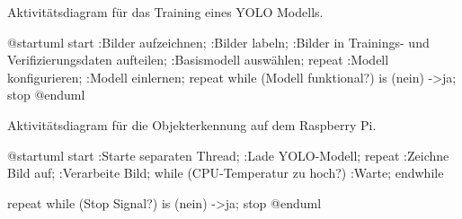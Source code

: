 
Aktivitätsdiagram für das Training eines YOLO Modells.

\begin{plantuml}    
@startuml
start
:Bilder aufzeichnen;
:Bilder labeln;
:Bilder in Trainings- und Verifizierungsdaten aufteilen;
:Basismodell auswählen;
repeat
    :Modell konfigurieren;
    :Modell einlernen;
repeat while (Modell funktional?) is (nein)
->ja;
stop
@enduml
\end{plantuml}


Aktivitätsdiagram für die Objekterkennung auf dem Raspberry Pi.

\begin{plantuml}
@startuml
start
:Starte separaten Thread;
:Lade YOLO-Modell;
repeat
    :Zeichne Bild auf;
    :Verarbeite Bild;
    while (CPU-Temperatur zu hoch?)
        :Warte;
    endwhile
    
repeat while (Stop Signal?) is (nein)
->ja;
stop
@enduml
\end{plantuml}